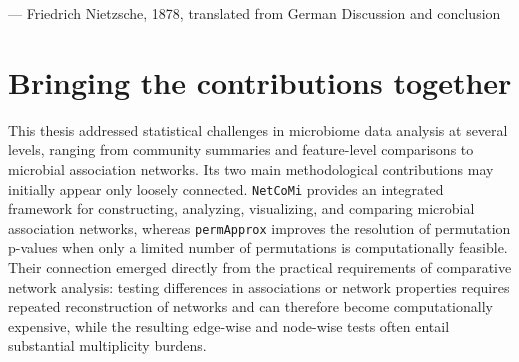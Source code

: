 
  {--- Friedrich Nietzsche, 1878, translated from German}
  {Discussion and conclusion}
\nocite{nietzsche1878human}
\chaptercontents

\section{Bringing the contributions together}

This thesis addressed statistical challenges in microbiome data analysis at several levels, ranging from community summaries and feature-level comparisons to microbial association networks. Its two main methodological contributions may initially appear only loosely connected. \texttt{NetCoMi} provides an integrated framework for constructing, analyzing, visualizing, and comparing microbial association networks, whereas \texttt{permApprox} improves the resolution of permutation p-values when only a limited number of permutations is computationally feasible. Their connection emerged directly from the practical requirements of comparative network analysis: testing differences in associations or network properties requires repeated reconstruction of networks and can therefore become computationally expensive, while the resulting edge-wise and node-wise tests often entail substantial multiplicity burdens.

